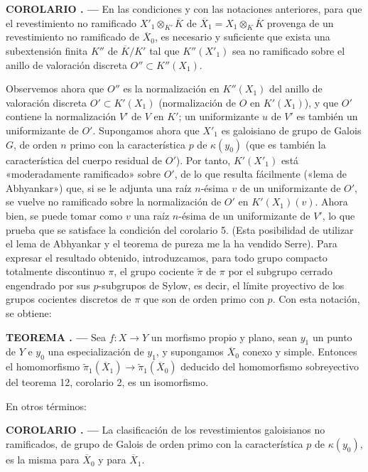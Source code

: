 \documentclass[11pt,twoside,openany]{book}
\numberwithin{equation}{section}
\newcommand{\src}[1]{%
  \phantomsection\hypertarget{src:#1}{}%
  \marginpar{\raggedleft\footnotesize\sffamily #1}%
}
\theoremstyle{plain}
\theoremstyle{definition}
\theoremstyle{remark}
\newcommand{\result}[2]{%
  \par\medskip\noindent\textbf{#1%
  \if\relax\detokenize{#2}\relax\else\space#2\fi. ---}\enspace
}
\newcommand{\FgaUnitKey}{frontmatter}
\renewcommand{\src}[1]{%
  \phantomsection\hypertarget{src:\FgaUnitKey:#1}{}%
  \marginpar{\raggedleft\footnotesize\sffamily #1}%
}
\theoremstyle{plain}
\theoremstyle{definition}
\theoremstyle{remark}
\begin{document}
\src{218}
\result{COROLARIO}{5} En las condiciones y con las notaciones anteriores, para
que el revestimiento no ramificado
$X'_1\otimes_{K'}\overline K$ de
$\overline X_1=X_1\otimes_K\overline K$ provenga de un revestimiento no
ramificado de $\overline X_0$, es necesario y suficiente que exista una
subextensión finita $K''$ de $\overline K/K'$ tal que $K''(X'_1)$ sea no
ramificado sobre el anillo de valoración discreta $O''\subset K''(X_1)$.

Observemos ahora que $O''$ es la normalización en $K''(X_1)$ del anillo de
valoración discreta $O'\subset K'(X_1)$ (normalización de $O$ en $K'(X_1)$), y
que $O'$ contiene la normalización $V'$ de $V$ en $K'$; un uniformizante $u$ de
$V'$ es también un uniformizante de $O'$. Supongamos ahora que $X'_1$ es
galoisiano de grupo de Galois $G$, de orden $n$ primo con la característica $p$
de $\kappa(y_0)$ (que es también la característica del cuerpo residual de
$O'$). Por tanto, $K'(X'_1)$ está «moderadamente ramificado» sobre $O'$, de lo
que resulta fácilmente («lema de Abhyankar») que, si se le adjunta una raíz
$n$-ésima $v$ de un uniformizante de $O'$, se vuelve no ramificado sobre la
normalización de $O'$ en $K'(X_1)(v)$. Ahora bien, se puede tomar como $v$ una
raíz $n$-ésima de un uniformizante de $V'$, lo que prueba que se satisface la
condición del corolario 5. (Esta posibilidad de utilizar el lema de Abhyankar y
el teorema de pureza me la ha vendido Serre). Para expresar el resultado
obtenido, introduzcamos, para todo grupo compacto totalmente discontinuo $\pi$,
el grupo cociente $\widetilde\pi$ de $\pi$ por el subgrupo cerrado engendrado
por sus $p$-subgrupos de Sylow, es decir, el límite proyectivo de los grupos
cocientes discretos de $\pi$ que son de orden primo con $p$. Con esta notación,
se obtiene:

\result{TEOREMA}{13} Sea $f:X\longrightarrow Y$ un morfismo propio y plano,
sean $y_1$ un punto de $Y$ e $y_0$ una especialización de $y_1$, y supongamos
$\overline X_0$ conexo y simple. Entonces el homomorfismo
$\widetilde\pi_1(\overline X_1)\longrightarrow
\widetilde\pi_1(\overline X_0)$ deducido del homomorfismo sobreyectivo del
teorema 12, corolario 2, es un isomorfismo.

En otros términos:

\src{219}
\result{COROLARIO}{1} La clasificación de los revestimientos galoisianos no
ramificados, de grupo de Galois de orden primo con la característica $p$ de
$\kappa(y_0)$, es la misma para $\overline X_0$ y para $\overline X_1$.
\end{document}
